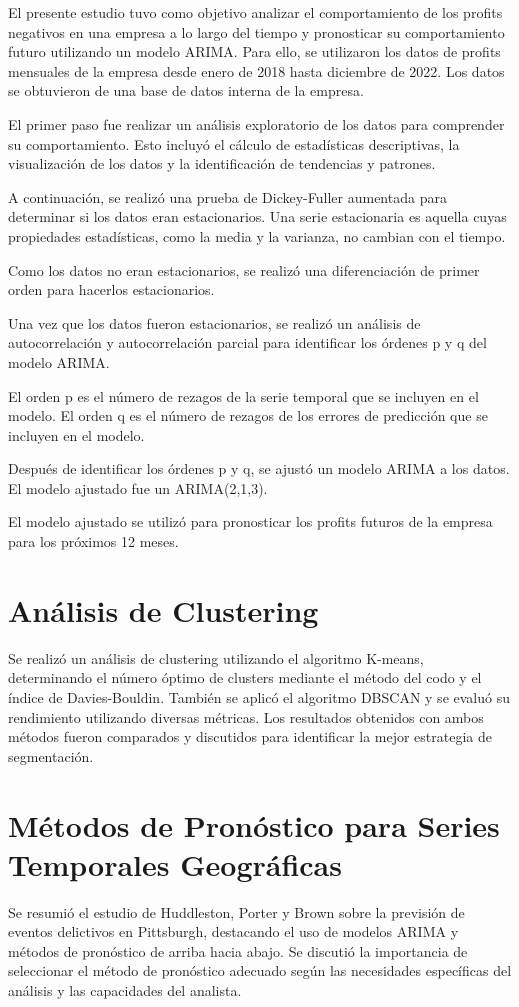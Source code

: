 \documentclass[preprint,12pt]{elsarticle}
\begin{document}
El presente estudio tuvo como objetivo analizar el comportamiento de los profits negativos en una empresa a lo largo del tiempo y pronosticar su comportamiento futuro utilizando un modelo ARIMA. Para ello, se utilizaron los datos de profits mensuales de la empresa desde enero de 2018 hasta diciembre de 2022. Los datos se obtuvieron de una base de datos interna de la empresa.

El primer paso fue realizar un análisis exploratorio de los datos para comprender su comportamiento. Esto incluyó el cálculo de estadísticas descriptivas, la visualización de los datos y la identificación de tendencias y patrones.

A continuación, se realizó una prueba de Dickey-Fuller aumentada para determinar si los datos eran estacionarios. Una serie estacionaria es aquella cuyas propiedades estadísticas, como la media y la varianza, no cambian con el tiempo.

Como los datos no eran estacionarios, se realizó una diferenciación de primer orden para hacerlos estacionarios.

Una vez que los datos fueron estacionarios, se realizó un análisis de autocorrelación y autocorrelación parcial para identificar los órdenes p y q del modelo ARIMA.

El orden p es el número de rezagos de la serie temporal que se incluyen en el modelo. El orden q es el número de rezagos de los errores de predicción que se incluyen en el modelo.

Después de identificar los órdenes p y q, se ajustó un modelo ARIMA a los datos. El modelo ajustado fue un ARIMA(2,1,3).

El modelo ajustado se utilizó para pronosticar los profits futuros de la empresa para los próximos 12 meses.

\section{Análisis de Clustering}
Se realizó un análisis de clustering utilizando el algoritmo K-means, determinando el número óptimo de clusters mediante el método del codo y el índice de Davies-Bouldin. También se aplicó el algoritmo DBSCAN y se evaluó su rendimiento utilizando diversas métricas. Los resultados obtenidos con ambos métodos fueron comparados y discutidos para identificar la mejor estrategia de segmentación.

\section{Métodos de Pronóstico para Series Temporales Geográficas}
Se resumió el estudio de Huddleston, Porter y Brown sobre la previsión de eventos delictivos en Pittsburgh, destacando el uso de modelos ARIMA y métodos de pronóstico de arriba hacia abajo. Se discutió la importancia de seleccionar el método de pronóstico adecuado según las necesidades específicas del análisis y las capacidades del analista.
\end{document}
